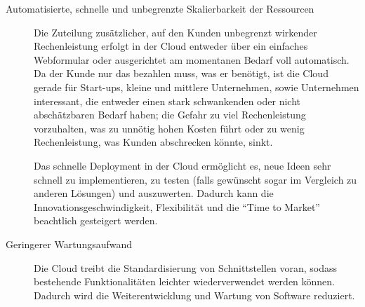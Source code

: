 \begin{description}
	\item[Automatisierte, schnelle und unbegrenzte Skalierbarkeit der
Ressourcen] Die Zuteilung zusätzlicher, auf den Kunden unbegrenzt wirkender
Rechenleistung erfolgt in der Cloud entweder über ein einfaches Webformular oder
ausgerichtet am momentanen Bedarf voll automatisch. Da der Kunde nur das
bezahlen muss, was er benötigt, ist die Cloud gerade für Start-ups, kleine und
mittlere Unternehmen, sowie Unternehmen interessant, die entweder einen stark
schwankenden oder nicht abschätzbaren Bedarf haben; die Gefahr zu viel
Rechenleistung vorzuhalten, was zu unnötig hohen Kosten führt oder zu wenig
Rechenleistung, was Kunden abschrecken könnte,
sinkt.

Das schnelle Deployment in der Cloud ermöglicht es, neue Ideen sehr
schnell zu implementieren, zu testen (falls gewünscht sogar im Vergleich zu
anderen Lösungen) und auszuwerten. Dadurch kann die Innovationsgeschwindigkeit,
Flexibilität und die "`Time to Market"' beachtlich gesteigert werden.

	\item[Geringerer Wartungsaufwand] Die Cloud treibt die Standardisierung
von Schnittstellen voran, sodass bestehende Funktionalitäten leichter
wiederverwendet werden können. Dadurch wird die Weiterentwicklung und Wartung
von Software reduziert. 
\end{description}

